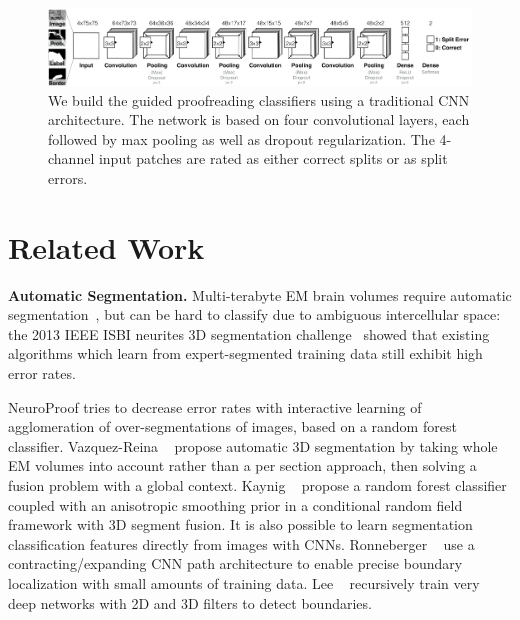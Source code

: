 \begin{figure}[t]
\begin{center}
\includegraphics[width=\linewidth]{gfx/architecture.png}
\end{center}
  \vspace{-4mm}
   \caption{We build the guided proofreading classifiers using a traditional CNN architecture. The network is based on four convolutional layers, each followed by max pooling as well as dropout regularization. The 4-channel input patches are rated as either correct splits or as split errors.}
\label{fig:architecture}
\end{figure}

\section{Related Work}

\textbf{Automatic Segmentation.} Multi-terabyte EM brain volumes require automatic segmentation~\cite{jain2010,Liu2014,NunezIglesias2013Machine,GALA2014}, but can be hard to classify due to ambiguous intercellular space: the 2013 IEEE ISBI neurites 3D segmentation challenge~\cite{isbi_challenge} showed that existing algorithms which learn from expert-segmented training data still exhibit high error rates.

NeuroProof \cite{neuroproof2013} tries to decrease error rates with interactive learning of agglomeration of over-segmentations of images, based on a random forest classifier. Vazquez-Reina \etal~\cite{amelio_segmentation} propose automatic 3D segmentation by taking whole EM volumes into account rather than a per section approach, then solving a fusion problem with a global context. Kaynig \etal~\cite{kaynig10} propose a random forest classifier coupled with an anisotropic smoothing prior in a conditional random field framework with 3D segment fusion. It is also possible to learn segmentation classification features directly from images with CNNs. Ronneberger \etal~\cite{RonnebergerFB15} use a contracting/expanding CNN path architecture to enable precise boundary localization with small amounts of training data. Lee \etal~\cite{lee2015recursive} recursively train very deep networks with 2D and 3D filters to detect boundaries. 

